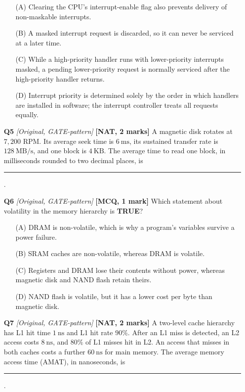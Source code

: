 \documentclass[11pt]{article}
\begin{document}
\begin{enumerate}
\begin{enumerate}
  \item[(A)] Clearing the CPU's interrupt-enable flag also prevents delivery of non-maskable interrupts.
  \item[(B)] A masked interrupt request is discarded, so it can never be serviced at a later time.
  \item[(C)] While a high-priority handler runs with lower-priority interrupts masked, a pending lower-priority request is normally serviced after the high-priority handler returns.
  \item[(D)] Interrupt priority is determined solely by the order in which handlers are installed in software; the interrupt controller treats all requests equally.
\end{enumerate}

\item[\textbf{Q5}] \textit{[Original, GATE-pattern]} \textbf{[NAT, 2 marks]} A magnetic disk rotates at $7{,}200$ RPM. Its average seek time is $6\ \text{ms}$, its sustained transfer rate is $128\ \text{MB/s}$, and one block is $4\ \text{KB}$. The average time to read one block, in milliseconds rounded to two decimal places, is \rule{1.5cm}{0.4pt}.

\item[\textbf{Q6}] \textit{[Original, GATE-pattern]} \textbf{[MCQ, 1 mark]} Which statement about volatility in the memory hierarchy is \textbf{TRUE}?

\begin{enumerate}
  \item[(A)] DRAM is non-volatile, which is why a program's variables survive a power failure.
  \item[(B)] SRAM caches are non-volatile, whereas DRAM is volatile.
  \item[(C)] Registers and DRAM lose their contents without power, whereas magnetic disk and NAND flash retain theirs.
  \item[(D)] NAND flash is volatile, but it has a lower cost per byte than magnetic disk.
\end{enumerate}

\item[\textbf{Q7}] \textit{[Original, GATE-pattern]} \textbf{[NAT, 2 marks]} A two-level cache hierarchy has L1 hit time $1\ \text{ns}$ and L1 hit rate $90\%$. After an L1 miss is detected, an L2 access costs $8\ \text{ns}$, and $80\%$ of L1 misses hit in L2. An access that misses in both caches costs a further $60\ \text{ns}$ for main memory. The average memory access time (AMAT), in nanoseconds, is \rule{1.5cm}{0.4pt}.


\end{enumerate}
\end{document}
